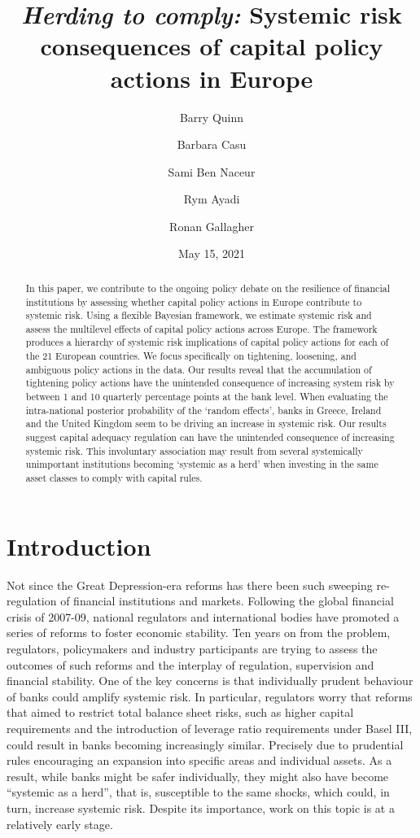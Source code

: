 \documentclass[
  10pt,
]{article}
\title{\emph{Herding to comply:} Systemic risk consequences of capital policy
actions in Europe}
\author{Barry Quinn \and Barbara Casu \and Sami Ben Naceur \and Rym Ayadi \and Ronan Gallagher}
\date{May 15, 2021}
\begin{document}
\maketitle
\begin{abstract}
In this paper, we contribute to the ongoing policy debate on the
resilience of financial institutions by assessing whether capital policy
actions in Europe contribute to systemic risk. Using a flexible Bayesian
framework, we estimate systemic risk and assess the multilevel effects
of capital policy actions across Europe. The framework produces a
hierarchy of systemic risk implications of capital policy actions for
each of the 21 European countries. We focus specifically on tightening,
loosening, and ambiguous policy actions in the data. Our results reveal
that the accumulation of tightening policy actions have the unintended
consequence of increasing system risk by between 1 and 10 quarterly
percentage points at the bank level. When evaluating the intra-national
posterior probability of the `random effects', banks in Greece, Ireland
and the United Kingdom seem to be driving an increase in systemic risk.
Our results suggest capital adequacy regulation can have the unintended
consequence of increasing systemic risk. This involuntary association
may result from several systemically unimportant institutions becoming
`systemic as a herd' when investing in the same asset classes to comply
with capital rules.
\end{abstract}

\hypertarget{introduction}{%
\section{Introduction}\label{introduction}}

Not since the Great Depression-era reforms has there been such sweeping
re-regulation of financial institutions and markets. Following the
global financial crisis of 2007-09, national regulators and
international bodies have promoted a series of reforms to foster
economic stability. Ten years on from the problem, regulators,
policymakers and industry participants are trying to assess the outcomes
of such reforms and the interplay of regulation, supervision and
financial stability. One of the key concerns is that individually
prudent behaviour of banks could amplify systemic risk. In particular,
regulators worry that reforms that aimed to restrict total balance sheet
risks, such as higher capital requirements and the introduction of
leverage ratio requirements under Basel III, could result in banks
becoming increasingly similar. Precisely due to prudential rules
encouraging an expansion into specific areas and individual assets. As a
result, while banks might be safer individually, they might also have
become ``systemic as a herd'', that is, susceptible to the same shocks,
which could, in turn, increase systemic risk. Despite its importance,
work on this topic is at a relatively early stage.
\end{document}
